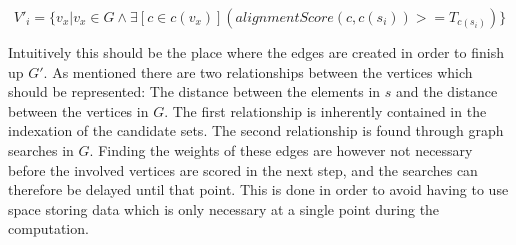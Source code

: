 \documentclass[thesis.tex]{subfiles}
\begin{document}
\begin{equation}
  V'_i=\{v_x|v_x \in G \land \exists [c \in c(v_x)](alignmentScore(c, c(s_i)) >= T_{c(s_i)})\}
\end{equation}
\par\noindent
Intuitively this should be the place where the edges are created in order to finish up $G'$. As mentioned there are two relationships between the vertices which should be represented: The distance between the elements in $s$ and the distance between the vertices in $G$. The first relationship is inherently contained in the indexation of the candidate sets. The second relationship is found through graph searches in $G$. Finding the weights of these edges are however not necessary before the involved vertices are scored in the next step, and the searches can therefore be delayed until that point. This is done in order to avoid having to use space storing data which is only necessary at a single point during the computation.
\end{document}
